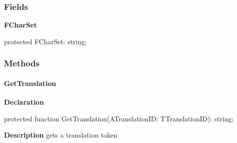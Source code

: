 \documentclass{report}
\newif\ifpdf
\begin{document}
\subsubsection*{\large{\textbf{Fields}}\normalsize\hspace{1ex}\hfill}
\begin{list}{}{
\setlength{\itemindent}{0cm}
\setlength{\listparindent}{0cm}
\setlength{\leftmargin}{\evensidemargin}
\addtolength{\leftmargin}{\tmplength}
\settowidth{\labelsep}{X}
\addtolength{\leftmargin}{\labelsep}
\setlength{\labelwidth}{\tmplength}
}
\label{PasDoc_Languages.TPasDocLanguages-FCharSet}
\item[\textbf{FCharSet}\hfill]
\ifpdf
\begin{flushleft}
\fi
\begin{ttfamily}
protected FCharSet: string;\end{ttfamily}

\ifpdf
\end{flushleft}
\fi


\par  \end{list}
\subsubsection*{\large{\textbf{Methods}}\normalsize\hspace{1ex}\hfill}
\paragraph*{GetTranslation}\hspace*{\fill}

\label{PasDoc_Languages.TPasDocLanguages-GetTranslation}
\begin{list}{}{
\setlength{\itemindent}{0cm}
\setlength{\listparindent}{0cm}
\setlength{\leftmargin}{\evensidemargin}
\addtolength{\leftmargin}{\tmplength}
\settowidth{\labelsep}{X}
\addtolength{\leftmargin}{\labelsep}
\setlength{\labelwidth}{\tmplength}
}
\item[\textbf{Declaration}\hfill]
\ifpdf
\begin{flushleft}
\fi
\begin{ttfamily}
protected function GetTranslation(ATranslationID: TTranslationID): string;\end{ttfamily}

\ifpdf
\end{flushleft}
\fi

\par
\item[\textbf{Description}]
gets a translation token

\end{list}
\end{document}
